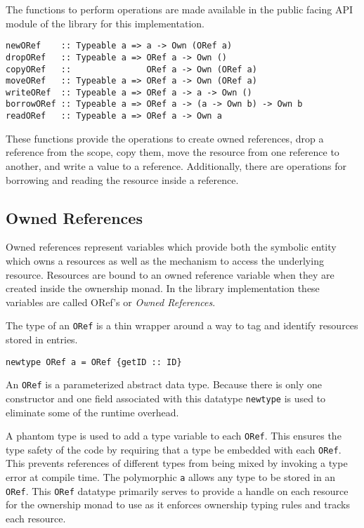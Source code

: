 \documentclass[onehalf,11pt]{beavtex}
\begin{document}
The functions to perform operations are made available in the public facing API
module of the library for this implementation.

\begin{verbatim}
newORef    :: Typeable a => a -> Own (ORef a)
dropORef   :: Typeable a => ORef a -> Own ()
copyORef   ::               ORef a -> Own (ORef a)
moveORef   :: Typeable a => ORef a -> Own (ORef a)
writeORef  :: Typeable a => ORef a -> a -> Own ()
borrowORef :: Typeable a => ORef a -> (a -> Own b) -> Own b
readORef   :: Typeable a => ORef a -> Own a
\end{verbatim}

These functions provide the operations to create owned references,
drop a reference from the scope, copy them, move the resource from one reference
to another,  and write a value to a reference.
Additionally, there are operations for borrowing and reading the resource inside
a reference.

\subsection{Owned References}

Owned references represent variables which provide both the symbolic entity
which owns a resources as well as the mechanism to access the underlying
resource.
Resources are bound to an owned reference variable when they are created inside
the ownership monad.
In the library implementation these variables are called ORef's or
\textit{Owned References}.

The type of an \texttt{ORef} is a thin wrapper around a way to tag and identify
resources stored in entries.

\begin{verbatim}
newtype ORef a = ORef {getID :: ID}
\end{verbatim}

An \texttt{ORef} is a parameterized abstract data type. Because there is only
one constructor and one field associated with this datatype
\texttt{newtype} is used to eliminate some of the runtime overhead.

A phantom type is used to add a type variable to each \texttt{ORef}. This
ensures the type safety of the code by requiring that a type be embedded
with each \texttt{ORef}.
This prevents references of different types from being mixed by invoking a
type error at compile time.
The polymorphic \texttt{a} allows any type to be stored in an \texttt{ORef}.
This \texttt{ORef} datatype primarily serves to provide a handle on each
resource for the ownership monad to use as it enforces ownership typing rules
and tracks each resource.
\end{document}
